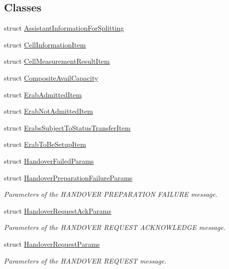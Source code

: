 \subsection*{Classes}
\begin{DoxyCompactItemize}
\item 
struct \hyperlink{structns3_1_1EpcX2Sap_1_1AssistantInformationForSplitting}{Assistant\+Information\+For\+Splitting}
\item 
struct \hyperlink{structns3_1_1EpcX2Sap_1_1CellInformationItem}{Cell\+Information\+Item}
\item 
struct \hyperlink{structns3_1_1EpcX2Sap_1_1CellMeasurementResultItem}{Cell\+Measurement\+Result\+Item}
\item 
struct \hyperlink{structns3_1_1EpcX2Sap_1_1CompositeAvailCapacity}{Composite\+Avail\+Capacity}
\item 
struct \hyperlink{structns3_1_1EpcX2Sap_1_1ErabAdmittedItem}{Erab\+Admitted\+Item}
\item 
struct \hyperlink{structns3_1_1EpcX2Sap_1_1ErabNotAdmittedItem}{Erab\+Not\+Admitted\+Item}
\item 
struct \hyperlink{structns3_1_1EpcX2Sap_1_1ErabsSubjectToStatusTransferItem}{Erabs\+Subject\+To\+Status\+Transfer\+Item}
\item 
struct \hyperlink{structns3_1_1EpcX2Sap_1_1ErabToBeSetupItem}{Erab\+To\+Be\+Setup\+Item}
\item 
struct \hyperlink{structns3_1_1EpcX2Sap_1_1HandoverFailedParams}{Handover\+Failed\+Params}
\item 
struct \hyperlink{structns3_1_1EpcX2Sap_1_1HandoverPreparationFailureParams}{Handover\+Preparation\+Failure\+Params}
\begin{DoxyCompactList}\small\item\em Parameters of the H\+A\+N\+D\+O\+V\+ER P\+R\+E\+P\+A\+R\+A\+T\+I\+ON F\+A\+I\+L\+U\+RE message. \end{DoxyCompactList}\item 
struct \hyperlink{structns3_1_1EpcX2Sap_1_1HandoverRequestAckParams}{Handover\+Request\+Ack\+Params}
\begin{DoxyCompactList}\small\item\em Parameters of the H\+A\+N\+D\+O\+V\+ER R\+E\+Q\+U\+E\+ST A\+C\+K\+N\+O\+W\+L\+E\+D\+GE message. \end{DoxyCompactList}\item 
struct \hyperlink{structns3_1_1EpcX2Sap_1_1HandoverRequestParams}{Handover\+Request\+Params}
\begin{DoxyCompactList}\small\item\em Parameters of the H\+A\+N\+D\+O\+V\+ER R\+E\+Q\+U\+E\+ST message. \end{DoxyCompactList}\item 

\end{DoxyCompactItemize}
